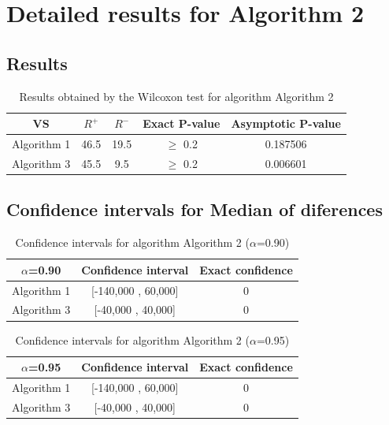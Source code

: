 \documentclass[a4paper,10pt]{article}
\begin{document}
 \clearpage 


\section{Detailed results for Algorithm 2}


\subsection{Results}

\begin{table}[!htp]
\centering\small
\begin{tabular}{
|c|c|c|c|c|}
\hline
 VS & $R^{+}$ & $R^{-}$ & Exact P-value & Asymptotic P-value \\ \hline 
Algorithm 1 & 46.5 & 19.5 & $\geq$ 0.2 & 0.187506\\ \hline 
Algorithm 3 & 45.5 & 9.5 & $\geq$ 0.2 & 0.006601\\ \hline 

\end{tabular}
\caption{Results obtained by the Wilcoxon test for algorithm Algorithm 2}
\end{table}

\subsection{Confidence intervals for Median of diferences}

\begin{table}[!htp]
\centering\small
\begin{tabular}{
|c|c|c|}
\hline
 $\alpha$=0.90 & Confidence interval & Exact confidence \\ \hline 
Algorithm 1 & [-140,000 , 60,000] & 0\\ \hline 
Algorithm 3 & [-40,000 , 40,000] & 0\\ \hline 

\end{tabular}
\caption{Confidence intervals for algorithm Algorithm 2 ($\alpha$=0.90)}
\end{table}
\begin{table}[!htp]
\centering\small
\begin{tabular}{
|c|c|c|}
\hline
 $\alpha$=0.95 & Confidence interval & Exact confidence \\ \hline 
Algorithm 1 & [-140,000 , 60,000] & 0\\ \hline 
Algorithm 3 & [-40,000 , 40,000] & 0\\ \hline 

\end{tabular}
\caption{Confidence intervals for algorithm Algorithm 2 ($\alpha$=0.95)}
\end{table}
\end{document}
